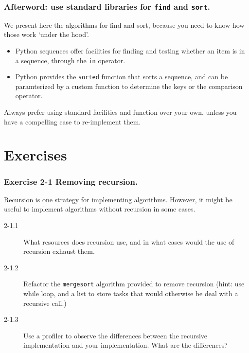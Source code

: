 \documentclass{beamer} %
\begin{document}
\begin{frame}
\frametitle{Afterword: use standard libraries for \texttt{find} and \texttt{sort}.}

We present here the algorithms for find and sort, because you need to know how those work `under the hood'.

\vspace{3mm}
\begin{itemize}
	\item Python sequences offer facilities for finding and testing whether an item is in a sequence, through the \texttt{in} operator.
	\item Python provides the \texttt{sorted} function that sorts a sequence, and can be paramterized by a custom function to determine the keys or the comparison operator.
\end{itemize}

\vspace{3mm}
Always prefer using standard facilities and function over your own, unless you have a compelling case to re-implement them.

\end{frame}

\section{Exercises}

\begin{frame}
\frametitle{Exercise 2-1 Removing recursion.}

Recursion is one strategy for implementing algorithms. However, it might be useful to implement algorithms without recursion in some cases.
\begin{description}
	\item[2-1.1] What resources does recursion use, and in what cases would the use of recursion exhaust them.
	\item[2-1.2] Refactor the \texttt{mergesort} algorithm provided to remove recursion (hint: use while loop, and a list to store tasks that would otherwise be deal with a recursive call.)
	\item[2-1.3] Use a profiler to observe the differences between the recursive implementation and your implementation. What are the differences?
\end{description}

\end{frame}
\end{document}
